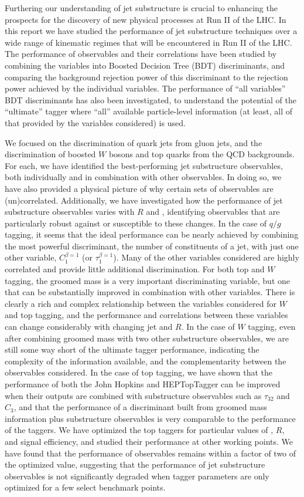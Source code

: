 Furthering our understanding of jet substructure is crucial to enhancing the prospects for the discovery of new physical processes at Run II of the LHC. In this report we have studied the performance of jet substructure techniques over a wide range of kinematic regimes that will be encountered in Run II of the LHC. The performance of observables and their correlations have been studied by combining the variables into Boosted Decision Tree (BDT) discriminants, and comparing the background rejection power of this discriminant to the rejection power achieved by the individual variables. The performance of ``all variables'' BDT discriminants has also been investigated, to understand the potential of the ``ultimate'' tagger where ``all'' available particle-level information (at least, all of that provided by the variables considered) is used.

We focused on the discrimination of quark jets from gluon jets, and the discrimination of boosted $W$ bosons and top quarks from the QCD backgrounds. For each, we have identified the best-performing jet substructure observables, both individually and in combination with other observables. In doing so, we have also provided a physical picture of why certain sets of observables are (un)correlated. Additionally, we have investigated how the performance of jet substructure observables varies with $R$ and \pt, identifying observables that are particularly robust against or susceptible to these changes. In the case of $q/g$ tagging, it seems that the ideal performance can be nearly achieved by combining the most powerful discriminant, the number of constituents of a jet, with just one other variable, $C_1^{\beta =1}$ (or $\tau_1^{\beta=1}$). Many of the other variables considered are highly correlated and provide little additional discrimination. For both top and $W$ tagging, the groomed mass is a very important discriminating variable, but one that can be substantially improved in combination with other variables. There is clearly a rich and complex relationship between the variables considered for $W$ and top tagging, and the performance and correlations between these variables can change considerably with changing jet \pt and $R$. In the case of $W$ tagging, even after combining groomed mass with two other substructure observables, we are still some way short of the ultimate tagger performance, indicating the complexity of the information available, and the complementarity between the observables considered. In the case of top tagging, we have shown that the performance of both the John Hopkins and HEPTopTagger can be improved when their outputs are combined with substructure observables such as $\tau_{32}$ and $C_{3}$, and that the performance of a discriminant built from groomed mass information plus substructure observables is very comparable to the performance of the taggers.  We have optimized the top taggers for particular values of \pt, $R$, and signal efficiency, and studied their performance at other working points. We have found that the performance of observables remains within a factor of two of the optimized value, suggesting that the performance of jet substructure observables is not significantly degraded when tagger parameters are only optimized for a few select benchmark points.

